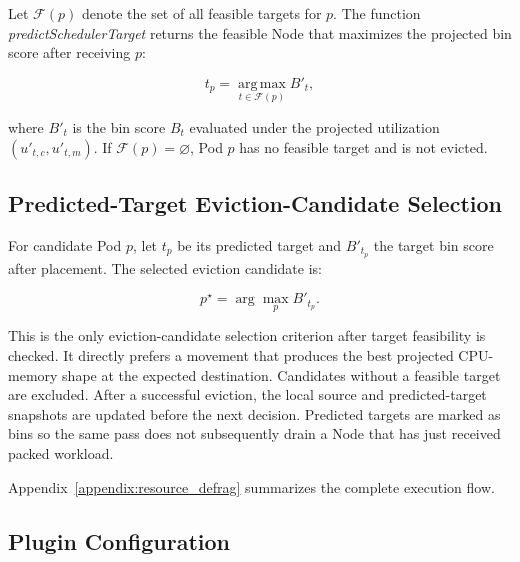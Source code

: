 Let \(\mathcal{F}(p)\) denote the set of all feasible targets for \(p\). The function \textit{predictSchedulerTarget} returns the feasible Node that maximizes the projected bin score after receiving \(p\):

\[
    t_p = \operatorname*{arg\,max}_{t \in \mathcal{F}(p)} B'_t,
\]

where \(B'_t\) is the bin score \(B_t\) evaluated under the projected utilization \(\left(u'_{t,c}, u'_{t,m}\right)\). If \(\mathcal{F}(p) = \varnothing\), Pod \(p\) has no feasible target and is not evicted.

\subsection{Predicted-Target Eviction-Candidate Selection}
\label{sec:defrag_victim_selection}

For candidate Pod \(p\), let \(t_p\) be its predicted target and \(B'_{t_p}\) the target bin score after placement. The selected eviction candidate is:

\[
    p^\star = \arg\max_{p} B'_{t_p}.
\]

This is the only eviction-candidate selection criterion after target feasibility is checked. It directly prefers a movement that produces the best projected CPU-memory shape at the expected destination. Candidates without a feasible target are excluded. After a successful eviction, the local source and predicted-target snapshots are updated before the next decision. Predicted targets are marked as bins so the same pass does not subsequently drain a Node that has just received packed workload.

Appendix~\ref{appendix:resource_defrag} summarizes the complete execution flow.

\subsection{Plugin Configuration}
\label{sec:resource_defrag_config}

